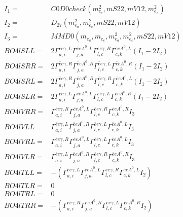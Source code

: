 \documentclass[A4,landscape]{article}
\begin{document}
\begin{align} 
I_1 = & C0D0check(m^2_{e_{{c}}}, mS22, mV12, m^2_{e_{{a}}}) \\ 
I_2 = & D_{27}(m^2_{e_{{a}}}, m^2_{e_{{c}}}, mS22, mV12) \\ 
I_3 = & MMD0(m_{e_{{a}}}, m_{e_{{c}}}, m^2_{e_{{a}}}, m^2_{e_{{c}}}, mS22, mV12) \\ 
  BO4lSLL= & 2  \Gamma^{\bar{e}e \gamma ,L}_{a, i} \Gamma^{\bar{e}e A^0 ,L}_{j, a} \Gamma^{\bar{e}e \gamma ,R}_{l, c} \Gamma^{\bar{e}e A^0 ,L}_{c, k} (I_1 - 2 I_2) \\ 
  BO4lSRR= & 2  \Gamma^{\bar{e}e \gamma ,R}_{a, i} \Gamma^{\bar{e}e A^0 ,R}_{j, a} \Gamma^{\bar{e}e \gamma ,L}_{l, c} \Gamma^{\bar{e}e A^0 ,R}_{c, k} (I_1 - 2 I_2) \\ 
  BO4lSRL= & 2  \Gamma^{\bar{e}e \gamma ,R}_{a, i} \Gamma^{\bar{e}e A^0 ,R}_{j, a} \Gamma^{\bar{e}e \gamma ,R}_{l, c} \Gamma^{\bar{e}e A^0 ,L}_{c, k} (I_1 - 2 I_2) \\ 
  BO4lSLR= & 2  \Gamma^{\bar{e}e \gamma ,L}_{a, i} \Gamma^{\bar{e}e A^0 ,L}_{j, a} \Gamma^{\bar{e}e \gamma ,L}_{l, c} \Gamma^{\bar{e}e A^0 ,R}_{c, k} (I_1 - 2 I_2) \\ 
  BO4lVRR= &  \Gamma^{\bar{e}e \gamma ,R}_{a, i} \Gamma^{\bar{e}e A^0 ,L}_{j, a} \Gamma^{\bar{e}e \gamma ,R}_{l, c} \Gamma^{\bar{e}e A^0 ,R}_{c, k} I_3 \\ 
  BO4lVLL= &  \Gamma^{\bar{e}e \gamma ,L}_{a, i} \Gamma^{\bar{e}e A^0 ,R}_{j, a} \Gamma^{\bar{e}e \gamma ,L}_{l, c} \Gamma^{\bar{e}e A^0 ,L}_{c, k} I_3 \\ 
  BO4lVRL= &  \Gamma^{\bar{e}e \gamma ,R}_{a, i} \Gamma^{\bar{e}e A^0 ,L}_{j, a} \Gamma^{\bar{e}e \gamma ,L}_{l, c} \Gamma^{\bar{e}e A^0 ,L}_{c, k} I_3 \\ 
  BO4lVLR= &  \Gamma^{\bar{e}e \gamma ,L}_{a, i} \Gamma^{\bar{e}e A^0 ,R}_{j, a} \Gamma^{\bar{e}e \gamma ,R}_{l, c} \Gamma^{\bar{e}e A^0 ,R}_{c, k} I_3 \\ 
  BO4lTLL= & -( \Gamma^{\bar{e}e \gamma ,L}_{a, i} \Gamma^{\bar{e}e A^0 ,L}_{j, a} \Gamma^{\bar{e}e \gamma ,R}_{l, c} \Gamma^{\bar{e}e A^0 ,L}_{c, k} I_2) \\ 
  BO4lTLR= & 0 \\ 
  BO4lTRL= & 0 \\ 
  BO4lTRR= & -( \Gamma^{\bar{e}e \gamma ,R}_{a, i} \Gamma^{\bar{e}e A^0 ,R}_{j, a} \Gamma^{\bar{e}e \gamma ,L}_{l, c} \Gamma^{\bar{e}e A^0 ,R}_{c, k} I_2) \\ 
\end{align} 
\end{document}
